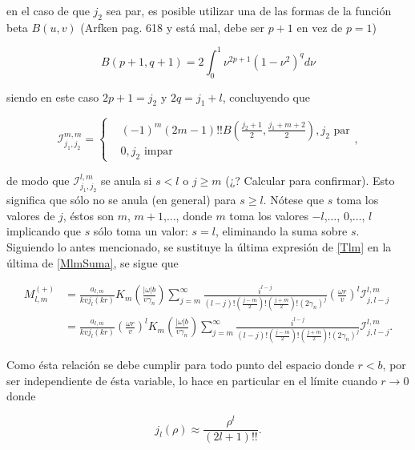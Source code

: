 \documentclass[a4paper,10pt]{article}
\begin{document}
en el caso de que $j_2$ sea par, es posible utilizar una de las formas de la función beta $B(u,v)$ (Arfken pag. 618 y está mal, debe ser $p+1$ en vez de $p=1$)

\begin{equation}
B(p+1,q+1)=2\int_0^1\nu^{2p+1}(1-\nu^2)^q d\nu
\end{equation}

siendo en este caso $2p+1=j_2$ y $2q=j_1+l$, concluyendo que

\begin{equation}
\mathcal{I}_{j_1,j_2}^{m,m}
=\left\{
\begin{aligned}
	&(-1)^m(2m-1)!!B\left(\frac{j_2+1}{2},\frac{j_1+m+2}{2}\right), j_2 \text{ par}	\\
	&0, j_2 \text{ impar}
\end{aligned},
\right.
\end{equation}

de modo que $\mathcal{I}_{j_1,j_2}^{l,m}$ se anula si $s<l$ o $j\geq m$ (¿? Calcular para confirmar). Esto significa que sólo no se anula (en general) para $s\geq l$. Nótese que $s$ toma los valores de $j$, éstos son $m$, $m+1$,$\ldots$, donde $m$ toma los valores $-l$,$\ldots$, $0$,$\ldots$, $l$ implicando que $s$ sólo toma un valor: $s=l$, eliminando la suma sobre $s$. Siguiendo lo antes mencionado, se sustituye la última expresión de \eqref{Tlm} en la última de \eqref{MlmSuma}, se sigue que

\begin{equation}
\begin{aligned}
M_{l,m}^{(+)}
	&=\frac{a_{l,m}}{kv j_l(kr)}K_m\left( \frac{|\omega|b}{v\gamma_n} \right) \sum_{j=m}^{\infty}\frac{i^{l-j}}{(l-j)!\left(\frac{j-m}{2}\right)!\left(\frac{j+m}{2}\right)!(2\gamma_n)^{j}}\left(\frac{\omega r}{v}\right)^{l}\mathcal{I}_{j,l-j}^{l,m}	\\
	&=\frac{a_{l,m}}{kv j_l(kr)}\left(\frac{\omega r}{v}\right)^{l}K_m\left( \frac{|\omega|b}{v\gamma_n} \right) \sum_{j=m}^{\infty}\frac{i^{l-j}}{(l-j)!\left(\frac{j-m}{2}\right)!\left(\frac{j+m}{2}\right)!(2\gamma_n)^{j}}\mathcal{I}_{j,l-j}^{l,m}.
\end{aligned}
\label{Mlm2}
\end{equation}

Como ésta relación se debe cumplir para todo punto del espacio donde $r<b$, por ser independiente de ésta variable, lo hace en particular en el límite cuando $r\rightarrow0$ donde 

\begin{equation}
j_l(\rho)\approx\frac{\rho^l}{(2l+1)!!}.
\end{equation}
\end{document}
